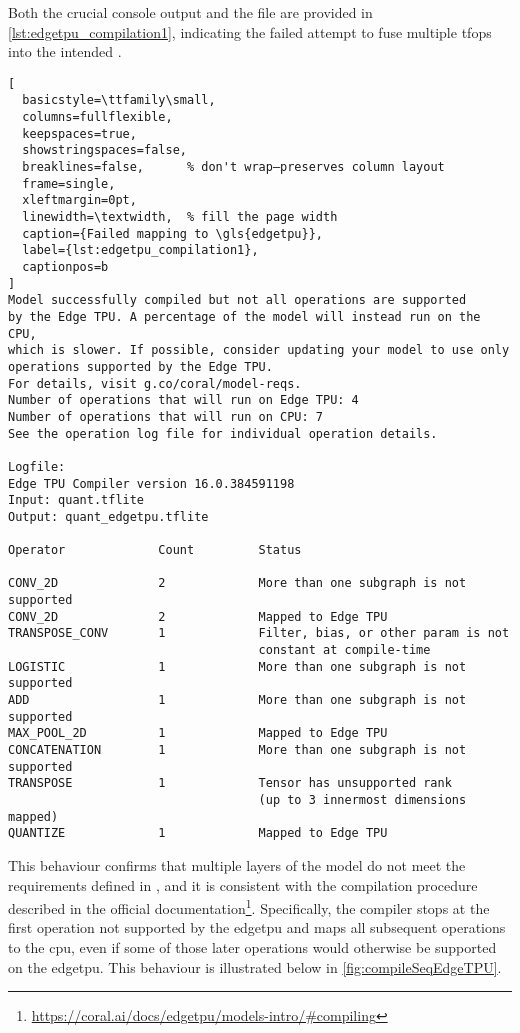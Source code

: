 {Both the crucial console output and the  file are provided in \autoref{lst:edgetpu_compilation1},
indicating the failed attempt to fuse multiple \glspl{tfop} into the intended .

\begin{lstlisting}[
  basicstyle=\ttfamily\small,
  columns=fullflexible,
  keepspaces=true,
  showstringspaces=false,
  breaklines=false,      % don't wrap—preserves column layout
  frame=single,
  xleftmargin=0pt,
  linewidth=\textwidth,  % fill the page width
  caption={Failed mapping to \gls{edgetpu}},
  label={lst:edgetpu_compilation1},
  captionpos=b
]
Model successfully compiled but not all operations are supported
by the Edge TPU. A percentage of the model will instead run on the CPU,
which is slower. If possible, consider updating your model to use only
operations supported by the Edge TPU.
For details, visit g.co/coral/model-reqs.
Number of operations that will run on Edge TPU: 4
Number of operations that will run on CPU: 7
See the operation log file for individual operation details.

Logfile:
Edge TPU Compiler version 16.0.384591198
Input: quant.tflite
Output: quant_edgetpu.tflite

Operator             Count         Status
      
CONV_2D              2             More than one subgraph is not supported
CONV_2D              2             Mapped to Edge TPU
TRANSPOSE_CONV       1             Filter, bias, or other param is not
                                   constant at compile-time
LOGISTIC             1             More than one subgraph is not supported
ADD                  1             More than one subgraph is not supported
MAX_POOL_2D          1             Mapped to Edge TPU
CONCATENATION        1             More than one subgraph is not supported
TRANSPOSE            1             Tensor has unsupported rank
                                   (up to 3 innermost dimensions mapped)
QUANTIZE             1             Mapped to Edge TPU
\end{lstlisting}

This behaviour confirms that multiple layers of the model do not meet the requirements defined in ,
and it is consistent with the compilation procedure described in the official documentation\footnote{\url{https://coral.ai/docs/edgetpu/models-intro/\#compiling}}.
Specifically, the compiler stops at the first operation not supported by the \gls{edgetpu} and maps all subsequent operations to the \gls{cpu},
even if some of those later operations would otherwise be supported on the \gls{edgetpu}.
This behaviour is illustrated below in \autoref{fig:compileSeqEdgeTPU}.

}

